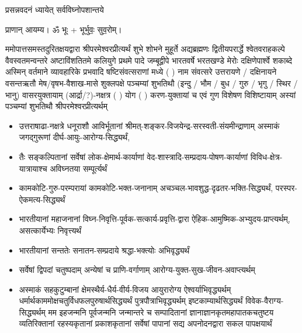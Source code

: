 
\setlength{\parindent}{0pt}




{प्रसन्नवदनं ध्यायेत् सर्वविघ्नोपशान्तये}
 
प्राणान्  आयम्य।  ॐ भूः + भूर्भुवः॒ सुव॒रोम्।


ममोपात्तसमस्तदुरितक्षयद्वारा श्रीपरमेश्वरप्रीत्यर्थं शुभे शोभने मुहूर्ते अद्यब्रह्मणः
द्वितीयपरार्द्धे श्वेतवराहकल्पे वैवस्वतमन्वन्तरे अष्टाविंशतितमे कलियुगे प्रथमे पादे
जम्बूद्वीपे भारतवर्षे भरतखण्डे मेरोः दक्षिणेपार्श्वे शकाब्दे अस्मिन् वर्तमाने व्यावहारिके
 प्रभवादि षष्टिसंवत्सराणां मध्ये (	) नाम संवत्सरे उत्तरायणे / दक्षिनायने 
वसन्तऋतौ  मेष/वृषभ-वैशाख-मासे शुक्लपक्षे पञ्चम्यां शुभतिथौ
(इन्दु / भौम / बुध / गुरु / भृगु / स्थिर / भानु) वासरयुक्तायाम्
(आर्द्रा/?)-नक्षत्र (  ) योग  (  ) करण-युक्तायां च एवं गुण विशेषण विशिष्टायाम्
अस्यां पञ्चम्यां  
शुभतिथौ श्रीपरमेश्वरप्रीत्यर्थम्

\begin{itemize}
\item उत्तराषाढा-नक्षत्रे धनूराशौ आविर्भू\-तानां श्रीमत्-शङ्कर-विजयेन्द्र-सरस्वती-संयमीन्द्राणाम् अस्माकं जगद्गुरूणां दीर्घ-आयुः-आरोग्य-सिद्ध्यर्थं,

\item तैः सङ्कल्पितानां सर्वेषां लोक-क्षेमार्थ-कार्याणां वेद-शास्त्रादि-सम्प्रदाय-पोषण-कार्याणां विविध-क्षेत्र-यात्रायाश्च अविघ्नतया सम्पूर्त्यर्थं

\item कामकोटि-गुरु-परम्परायां कामकोटि-भक्त-जनानाम् अचञ्चल-भावशुद्ध-दृढतर-भक्ति-सिद्ध्यर्थं, परस्पर-ऐकमत्य-सिद्ध्यर्थं

\item भारतीयानां महाजनानां विघ्न-निवृत्ति-पूर्वक-सत्कार्य-प्रवृत्ति-द्वारा ऐहिक-आमुष्मिक-अभ्युदय-प्राप्त्यर्थम्, असत्कार्येभ्यः निवृत्त्यर्थं

\item भारतीयानां सन्ततेः सनातन-सम्प्रदाये श्रद्धा-भक्त्योः अभिवृद्ध्यर्थं

\item सर्वेषां द्विपदां चतुष्पदाम् अन्येषां च प्राणि-वर्गाणाम् आरोग्य-युक्त-सुख-जीवन-अवाप्त्यर्थम्

\item अस्माकं सहकुटुम्बानां क्षेमस्थैर्य-धैर्य-वीर्य-विजय आयुरारोग्य ऐश्वर्याभिवृद्ध्यर्थम्
 धर्मार्थकाममोक्ष\-चतुर्विधफलपुरुषार्थसिद्ध्यर्थं पुत्रपौत्राभि\-वृद्ध्यर्थम् इष्टकाम्यार्थसिद्ध्यर्थं विवेक-वैराग्य-सिद्ध्यर्थम्
मम इहजन्मनि पूर्वजन्मनि जन्मान्तरे च सम्पादितानां ज्ञानाज्ञानकृतमहा\-पातकचतुष्टय
व्यतिरिक्तानां रहस्यकृतानां प्रकाशकृतानां सर्वेषां पापानां सद्य अपनोदनद्वारा सकल 
पापक्षयार्थं 

\end{itemize}

